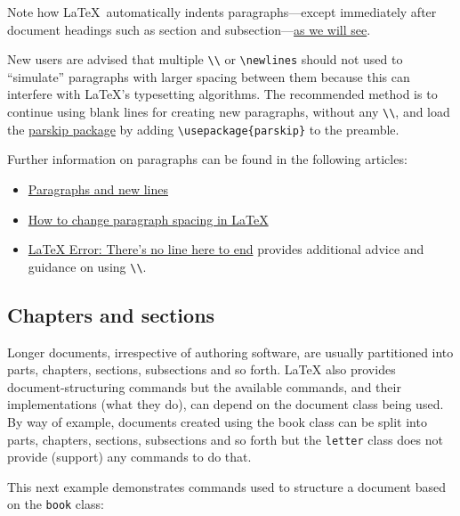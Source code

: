 Note how \LaTeX\ automatically indents paragraphs—except immediately after document headings such as section and subsection—\href{https://www.overleaf.com/learn/latex/Learn_LaTeX_in_30_minutes#Chapters_and_sections}{as we will see}.

New users are advised that multiple \verb|\\| or \verb|\newlines| should not used to “simulate” paragraphs with larger spacing between them because this can interfere with \LaTeX’s typesetting algorithms. The recommended method is to continue using blank lines for creating new paragraphs, without any \verb|\\|, and load the \href{https://ctan.org/pkg/parskip?lang=en}{parskip package} by adding \verb|\usepackage{parskip}| to the preamble.

Further information on paragraphs can be found in the following articles:

\begin{itemize}
    \item \href{https://www.overleaf.com/learn/latex/Paragraphs_and_new_lines}{Paragraphs and new lines}
    \item \href{https://www.overleaf.com/learn/latex/Articles/How_to_change_paragraph_spacing_in_LaTeX}{How to change paragraph spacing in LaTeX}
    \item \href{https://www.overleaf.com/learn/latex/Errors/LaTeX_Error%3A_There%27s_no_line_here_to_end}{LaTeX Error: There's no line here to end} provides additional advice and guidance on using \verb|\\|.
\end{itemize}

\subsection{Chapters and sections}

Longer documents, irrespective of authoring software, are usually partitioned into parts, chapters, sections, subsections and so forth. LaTeX also provides document-structuring commands but the available commands, and their implementations (what they do), can depend on the document class being used. By way of example, documents created using the book class can be split into parts, chapters, sections, subsections and so forth but the \verb|letter| class does not provide (support) any commands to do that.

This next example demonstrates commands used to structure a document based on the \verb|book| class:

